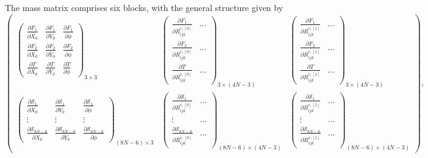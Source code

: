 \documentclass[a4paper,12pt]{article}
\begin{document}
The mass matrix comprises six blocks, with the general structure given by
\begin{equation}
\begin{pmatrix}
	\label{eqn:115}
	\begin{pmatrix}
		\frac{\partial F_1}{\partial\dot{X_0}} & \frac{\partial F_1}{\partial\dot{Y_0}} & \frac{\partial F_1}{\partial\dot{\phi}}\\
		\frac{\partial F_2}{\partial\dot{X_0}} & \frac{\partial F_2}{\partial\dot{Y_0}} & \frac{\partial F_2}{\partial\dot{\phi}}\\
		\frac{\partial T}{\partial\dot{X_0}} & \frac{\partial T}{\partial\dot{Y_0}} & \frac{\partial T}{\partial\dot{\phi}}
	\end{pmatrix}_{3\times 3} & \begin{pmatrix}
	\frac{\partial F_1}{\partial\dot{R_{ijk}^{e,[0]}}} & ...\\
	\frac{\partial F_2}{\partial\dot{R_{ijk}^{e,[0]}}} & ...\\
	\frac{\partial T}{\partial\dot{R_{ijk}^{e,[0]}}} & ...
\end{pmatrix}_{3\times (4N-3)} & \begin{pmatrix}
\frac{\partial F_1}{\partial\dot{R_{ijk}^{e,[1]}}} & ...\\
\frac{\partial F_2}{\partial\dot{R_{ijk}^{e,[1]}}} & ...\\
\frac{\partial T}{\partial\dot{R_{ijk}^{e,[1]}}} & ...
\end{pmatrix}_{3\times (4N-3)}\\
	\begin{pmatrix}
		\frac{\partial\mathcal{S}_1}{\partial\dot{X_0}} & \frac{\partial\mathcal{S}_1}{\partial\dot{Y_0}} & \frac{\partial\mathcal{S}_1}{\partial\dot{\phi}}\\
		\vdots & \vdots & \vdots\\
	\frac{\partial\mathcal{S}_{8N-6}}{\partial\dot{X_0}} & \frac{\partial\mathcal{S}_{8N-6}}{\partial\dot{Y_0}} & \frac{\partial\mathcal{S}_{8N-6}}{\partial\dot{\phi}}
	\end{pmatrix}_{(8N-6)\times 3} & \begin{pmatrix}
	\frac{\partial\mathcal{S}_1}{\partial\dot{R_{ijk}^{e,[0]}}} & ...\\
	\vdots & ...\\
	\frac{\partial\mathcal{S}_{8N-6}}{\partial\dot{R_{ijk}^{e,[0]}}} & ...
\end{pmatrix}_{(8N-6)\times (4N-3)} & \begin{pmatrix}
\frac{\partial\mathcal{S}_1}{\partial\dot{R_{ijk}^{e,[1]}}} & ...\\
\vdots & ...\\
\frac{\partial\mathcal{S}_{8N-6}}{\partial\dot{R_{ijk}^{e,[1]}}} & ...
\end{pmatrix}_{(8N-6)\times (4N-3)}
\end{pmatrix},
\end{equation}
\end{document}
